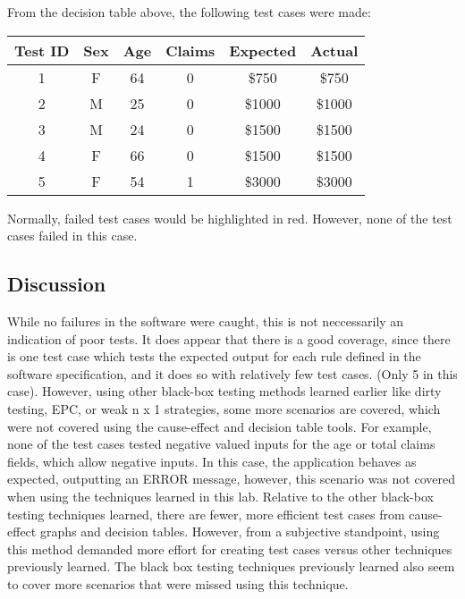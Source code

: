 From the decision table above, the following test cases were made:
\vspace{20pt}

\begin{adjustbox}{center}
	\begin{tabular}{cccccc}
		Test ID & Sex & Age & Claims & Expected & Actual \\ \hline
		1       & F   & 64  & 0      & \$750    & \$750  \\
		2       & M   & 25  & 0      & \$1000   & \$1000 \\
		3       & M   & 24  & 0      & \$1500   & \$1500 \\
		4       & F   & 66  & 0      & \$1500   & \$1500 \\
		5       & F   & 54  & 1      & \$3000   & \$3000 \\
	\end{tabular}%
\end{adjustbox}
Normally, failed test cases would be highlighted in red. However, none of the
test cases failed in this case.

\subsection{Discussion}
While no failures in the software were caught, this is not neccessarily an
indication of poor tests. It does appear that there is a good coverage, since
there is one test case which tests the expected output for each rule defined in
the software specification, and it does so with relatively few test cases.
(Only 5 in this case). However, using other black-box testing methods learned
earlier like dirty testing, EPC, or weak n x 1 strategies, some more scenarios
are covered, which were not covered using the cause-effect and decision table
tools. For example, none of the test cases tested negative valued
inputs for the age or total claims fields, which allow negative inputs. In this
case, the application behaves as expected, outputting an ERROR message,
however, this scenario was not covered when using the techniques learned in
this lab. Relative to the other black-box testing techniques learned, there are
fewer, more efficient test cases from cause-effect graphs and
decision tables. However, from a subjective standpoint, using this method
demanded more effort for creating test cases versus other techniques
previously learned. The black box testing techniques previously learned also
seem to cover more scenarios that were missed using this technique.
